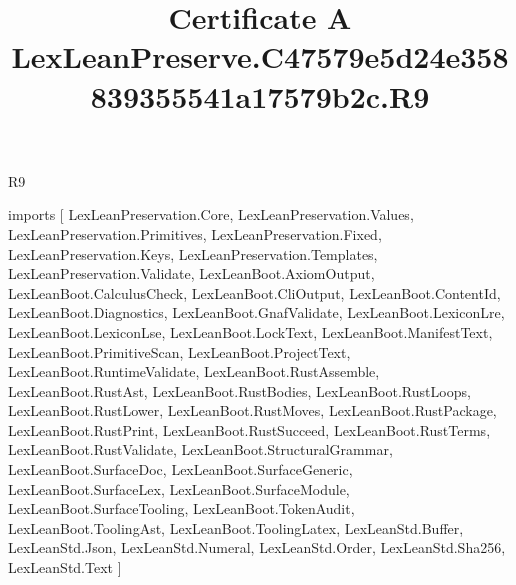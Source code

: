 \begin{lexlean}{R9}
\title{Certificate A LexLeanPreserve.C47579e5d24e358839355541a17579b2c.R9}
\begin{coremodule}
imports [
  LexLeanPreservation.Core,
  LexLeanPreservation.Values,
  LexLeanPreservation.Primitives,
  LexLeanPreservation.Fixed,
  LexLeanPreservation.Keys,
  LexLeanPreservation.Templates,
  LexLeanPreservation.Validate,
  LexLeanBoot.AxiomOutput,
  LexLeanBoot.CalculusCheck,
  LexLeanBoot.CliOutput,
  LexLeanBoot.ContentId,
  LexLeanBoot.Diagnostics,
  LexLeanBoot.GnafValidate,
  LexLeanBoot.LexiconLre,
  LexLeanBoot.LexiconLse,
  LexLeanBoot.LockText,
  LexLeanBoot.ManifestText,
  LexLeanBoot.PrimitiveScan,
  LexLeanBoot.ProjectText,
  LexLeanBoot.RuntimeValidate,
  LexLeanBoot.RustAssemble,
  LexLeanBoot.RustAst,
  LexLeanBoot.RustBodies,
  LexLeanBoot.RustLoops,
  LexLeanBoot.RustLower,
  LexLeanBoot.RustMoves,
  LexLeanBoot.RustPackage,
  LexLeanBoot.RustPrint,
  LexLeanBoot.RustSucceed,
  LexLeanBoot.RustTerms,
  LexLeanBoot.RustValidate,
  LexLeanBoot.StructuralGrammar,
  LexLeanBoot.SurfaceDoc,
  LexLeanBoot.SurfaceGeneric,
  LexLeanBoot.SurfaceLex,
  LexLeanBoot.SurfaceModule,
  LexLeanBoot.SurfaceTooling,
  LexLeanBoot.TokenAudit,
  LexLeanBoot.ToolingAst,
  LexLeanBoot.ToolingLatex,
  LexLeanStd.Buffer,
  LexLeanStd.Json,
  LexLeanStd.Numeral,
  LexLeanStd.Order,
  LexLeanStd.Sha256,
  LexLeanStd.Text
]


\end{coremodule}
\end{lexlean}
